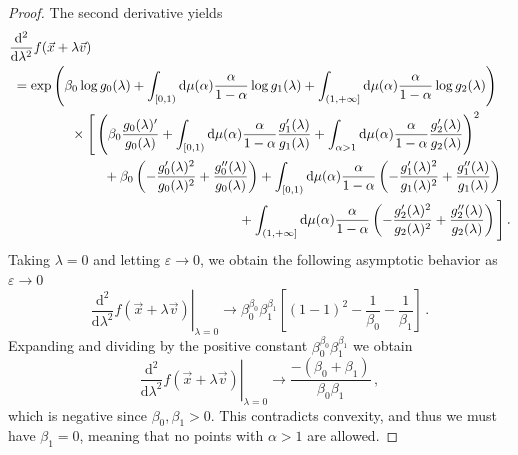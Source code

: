 \documentclass[aps,pra,11pt,onecolumn,nofootinbib,tightenlines]{revtex4-2}
\theoremstyle{definition}
\def \d {\mathrm{d}}
\begin{document}
\begin{proof}
The second derivative yields
\begin{align}
    &\frac{\d^2}{\d \lambda^2}f(\vec{x}+\lambda\vec{v})\notag\\
    &\; = \exp{\left(\beta_0 \log{g_0(\lambda)}+\int_{[0,1)}\d \mu(\alpha)\frac{\alpha}{1-\alpha}\log{g_1(\lambda)}+\int_{(1,+\infty]}\d \mu(\alpha)\frac{\alpha}{1-\alpha}\log{g_2(\lambda)}\right)}\notag\\
    &\; \; \quad \quad\qquad  \times \Bigg[\left(\beta_0\frac{g_0(\lambda)'}{g_0(\lambda)}+\int_{[0,1)}\d \mu(\alpha)\frac{\alpha}{1-\alpha}\frac{g'_1(\lambda)}{g_1(\lambda)}+\int_{\alpha >1}\d \mu(\alpha)\frac{\alpha}{1-\alpha}\frac{g'_2(\lambda)}{g_2(\lambda)}\right)^2\notag\\
    &\hspace{7em} +\beta_0\left(-\frac{g'_0(\lambda)^2}{g_0(\lambda)^2}+\frac{g''_0 (\lambda)}{g_0(\lambda)}\right) +\int_{[0,1)}\d \mu(\alpha)\frac{\alpha}{1-\alpha}\left(-\frac{g'_1(\lambda)^2}{g_1(\lambda)^2}+\frac{g''_1 (\lambda)}{g_1(\lambda)}\right)\notag\\
    & \hspace{17em} + \int_{(1,+\infty]}\d \mu(\alpha)\frac{\alpha}{1-\alpha}\left(-\frac{g'_2(\lambda)^2}{g_2(\lambda)^2}+\frac{g''_2 (\lambda)}{g_2(\lambda)}\right)\Bigg] \,.
\end{align}
Taking $\lambda = 0$ and letting $\varepsilon \to 0$, we obtain the following asymptotic behavior as $\varepsilon \to 0$
\begin{equation}
    \left.\frac{\d^2 }{\d\lambda^2}f(\vec{x}+\lambda\vec{v})\right\vert_{\lambda=0} \rightarrow \beta_0^{\beta_0} \beta_1^{\beta_1} \left[\left(1-1\right)^2-\frac{1}{\beta_0}-\frac{1}{\beta_1}\right] \,.
\end{equation}
Expanding and dividing by the positive constant $\beta_0^{\beta_0} \beta_1^{\beta_1}$ we obtain
\begin{equation}
    \left.\frac{\d^2 }{\d\lambda^2}f(\vec{x}+\lambda\vec{v})\right\vert_{\lambda=0} \rightarrow \frac{-(\beta_0+\beta_1)}{\beta_0\beta_1} \,,
\end{equation}
which is negative since $\beta_0, \beta_1 > 0$. This contradicts convexity, and thus we must have $\beta_1 = 0$, meaning that no points with $\alpha > 1$ are allowed.
\end{proof}
\end{document}

